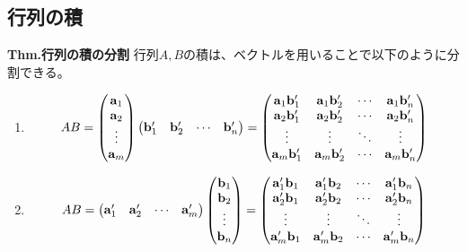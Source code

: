 \documentclass[a4paper,11pt]{jsarticle}
\numberwithin{equation}{section}
\begin{document}
\subsection{行列の積}
\begin{itembox}[l]{\textbf{Thm.行列の積の分割}}
  行列$A,B$の積は、ベクトルを用いることで以下のように分割できる。
  \begin{enumerate}
    \item 
    \begin{align}
      AB = \begin{pmatrix}
        \vb{a}_1\\
        \vb{a}_2\\
        \vdots\\
        \vb{a}_m
      \end{pmatrix}
      \begin{pmatrix}
        \vb{b}'_1 & \vb{b}'_2 & \cdots & \vb{b}'_n
      \end{pmatrix}
      =
      \begin{pmatrix}
        \vb{a}_1 \vb{b}'_1 & \vb{a}_1 \vb{b}'_2 & \cdots & \vb{a}_1 \vb{b}'_n\\
        \vb{a}_2 \vb{b}'_1 & \vb{a}_2 \vb{b}'_2 & \cdots & \vb{a}_2 \vb{b}'_n\\
        \vdots & \vdots & \ddots & \vdots\\
        \vb{a}_m \vb{b}'_1 & \vb{a}_m \vb{b}'_2 & \cdots & \vb{a}_m \vb{b}'_n
      \end{pmatrix}
    \end{align}
  \item 
  \begin{align}
    AB = \begin{pmatrix}
      \vb{a}'_1 & \vb{a}'_2 & \cdots & \vb{a}'_m
    \end{pmatrix}
    \begin{pmatrix}
      \vb{b}_1\\
      \vb{b}_2\\
      \vdots\\
      \vb{b}_n
    \end{pmatrix}  
    =
    \begin{pmatrix}
      \vb{a}'_1 \vb{b}_1 & \vb{a}'_1 \vb{b}_2 & \cdots & \vb{a}'_1 \vb{b}_n\\
      \vb{a}'_2 \vb{b}_1 & \vb{a}'_2 \vb{b}_2 & \cdots & \vb{a}'_2 \vb{b}_n\\
      \vdots & \vdots & \ddots & \vdots\\
      \vb{a}'_m \vb{b}_1 & \vb{a}'_m \vb{b}_2 & \cdots & \vb{a}'_m \vb{b}_n

\end{pmatrix}
\end{align}
\end{enumerate}
\end{itembox}
\end{document}
